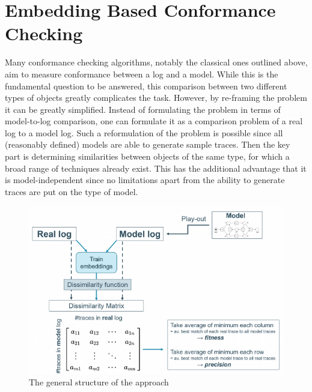 \documentclass[runningheads]{template/llncs}
\begin{document}
\section{Embedding Based Conformance Checking}
\label{sec:method}
Many conformance checking algorithms, notably the classical ones outlined above, aim to measure conformance between a log and a model.
While this is the fundamental question to be answered, this comparison between two different types of objects greatly complicates the task.
However, by re-framing the problem it  can be greatly simplified.
Instead of formulating the problem in terms of model-to-log comparison, one can formulate it as a comparison problem of a real log to a model log.
Such a reformulation of the problem is possible since all (reasonably defined) models are able to generate sample traces.
Then the key part is determining similarities between objects of the same type, for which a broad range of techniques already exist.
This has the additional advantage that it is model-independent since no limitations apart from the ability to generate traces are put on the type of model.
\begin{figure}
	\centering
	\includegraphics[width=.8\textwidth]{figures/structure}
	\caption{The general structure of the approach}
	\label{fig:structure}
\end{figure}
\end{document}
